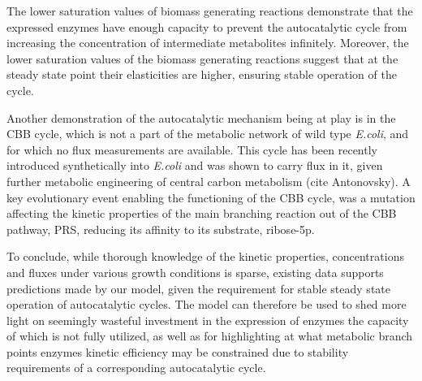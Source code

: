 \documentclass[a4page,notitlepage]{article}
\begin{document}
    The lower saturation values of biomass generating reactions demonstrate that the expressed enzymes have enough capacity to prevent the autocatalytic cycle from increasing the concentration of intermediate metabolites infinitely.
    Moreover, the lower saturation values of the biomass generating reactions suggest that at the steady state point their elasticities are higher, ensuring stable operation of the cycle.

    Another demonstration of the autocatalytic mechanism being at play is in the CBB cycle, which is not a part of the metabolic network of wild type \emph{E.coli}, and for which no flux measurements are available.
    This cycle has been recently introduced synthetically into \emph{E.coli} and was shown to carry flux in it, given further metabolic engineering of central carbon metabolism \cite{Antonovski2016} (cite Antonovsky).
    A key evolutionary event enabling the functioning of the CBB cycle, was a mutation affecting the kinetic properties of the main branching reaction out of the CBB pathway, PRS, reducing its affinity to its substrate, ribose-5p.

    To conclude, while thorough knowledge of the kinetic properties, concentrations and fluxes under various growth conditions is sparse, existing data supports predictions made by our model, given the requirement for stable steady state operation of autocatalytic cycles.
    The model can therefore be used to shed more light on seemingly wasteful investment in the expression of enzymes the capacity of which is not fully utilized, as well as for highlighting at what metabolic branch points enzymes kinetic efficiency may be constrained due to stability requirements of a corresponding autocatalytic cycle.
\end{document}
